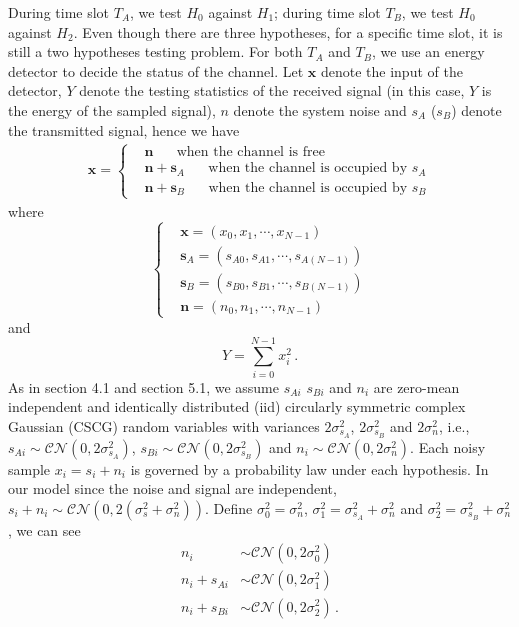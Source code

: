 During time slot $T_A$, we  test $H_0$ against $H_1$; during time slot $T_B$, we test $H_0$ against $H_2$. 
Even though there are three hypotheses, for a specific time slot, it is still a two hypotheses testing problem.  
For both $T_A$ and $T_B$, we use an energy detector to decide the status of the channel. Let $\mathbf{x}$ denote the input of the detector, $Y$ denote the testing statistics of the received signal (in this case, $Y$ is the energy of the sampled signal), $n$  denote the system noise and $s_A$ ($s_B$) denote the transmitted signal, hence we have
\begin{eqnarray}
  \mathbf{x} = \begin{cases}
    &\mathbf{n}\;\;\;\;\;\;\text{when the channel is free}\\
    &\mathbf{n} + \mathbf{s}_A \;\;\;\;\;\;\text{when the channel is occupied by $s_A$}\\
    &\mathbf{n} + \mathbf{s}_B \;\;\;\;\;\;\text{when the channel is occupied by $s_B$}
  \end{cases}
  \label{20150627a0}
\end{eqnarray}
where
\begin{equation}
  \begin{cases}
  &\mathbf{x} = (x_0, x_1, \cdots, x_{N-1})\\
  &\mathbf{s}_A = (s_{A0}, s_{A1}, \cdots, s_{A(N-1)})\\
  &\mathbf{s}_B = (s_{B0}, s_{B1}, \cdots, s_{B(N-1)})\\
  &\mathbf{n} = (n_{0}, n_{1}, \cdots, n_{N-1})
  \end{cases}
  \label{20150627a1}
\end{equation}
and
\begin{equation}
Y = \sum_{i=0}^{N-1} x_i^2\,.
\end{equation}
As in section 4.1 and section 5.1, we assume  $s_{Ai}$ $s_{Bi}$ and $n_i$ are zero-mean independent and identically distributed (iid) circularly symmetric complex Gaussian (CSCG) random variables with variances $2\sigma_{s_A}^2$, $2\sigma_{s_B}^2$ and $2\sigma_{n}^2$, i.e., $s_{Ai} \sim \mathcal{CN}(0, 2\sigma_{s_A}^2)$, $s_{Bi} \sim \mathcal{CN}(0, 2\sigma_{s_B}^2)$ and $n_i \sim \mathcal{CN}(0, 2\sigma_{n}^2)$.
Each noisy sample $x_i = s_i + n_i$ is governed by a probability law under each hypothesis. In our model
since the noise and signal are independent, $s_i+ n_i \sim \mathcal{CN}(0, 2(\sigma_{s}^2 + \sigma_n^2))$.  Define $\sigma_0^2 = \sigma_n^2$, $\sigma_1^2 = \sigma_{s_A}^2 + \sigma_n^2$ and $\sigma_2^2 = \sigma_{s_B}^2 + \sigma_n^2$, we can see
\begin{equation}
  \label{20150627a2}
  \begin{split}
  n_i &\sim \mathcal{CN}(0, 2\sigma_0^2)\\
  n_i + s_{Ai} &\sim \mathcal{CN}(0, 2\sigma_1^2)\\
   n_i + s_{Bi}&\sim \mathcal{CN}(0, 2\sigma_2^2) \,.
  \end{split}
\end{equation}

